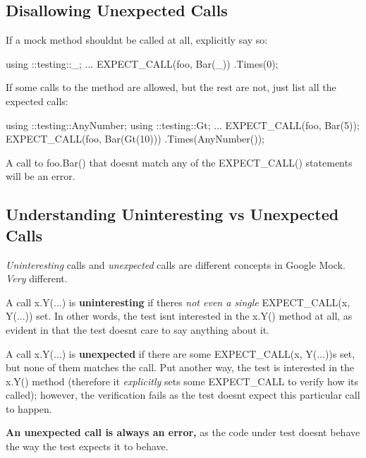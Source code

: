 \subsection*{Disallowing Unexpected Calls}

If a mock method shouldn\textquotesingle{}t be called at all, explicitly say so\+:


\begin{DoxyCode}
using ::testing::\_;
...
  EXPECT\_CALL(foo, Bar(\_))
      .Times(0);
\end{DoxyCode}


If some calls to the method are allowed, but the rest are not, just list all the expected calls\+:


\begin{DoxyCode}
using ::testing::AnyNumber;
using ::testing::Gt;
...
  EXPECT\_CALL(foo, Bar(5));
  EXPECT\_CALL(foo, Bar(Gt(10)))
      .Times(AnyNumber());
\end{DoxyCode}


A call to {\ttfamily foo.\+Bar()} that doesn\textquotesingle{}t match any of the {\ttfamily E\+X\+P\+E\+C\+T\+\_\+\+C\+A\+L\+L()} statements will be an error.

\subsection*{Understanding Uninteresting vs Unexpected Calls}

{\itshape Uninteresting} calls and {\itshape unexpected} calls are different concepts in Google Mock. {\itshape Very} different.

A call {\ttfamily x.\+Y(...)} is {\bfseries uninteresting} if there\textquotesingle{}s {\itshape not even a single} {\ttfamily E\+X\+P\+E\+C\+T\+\_\+\+C\+A\+LL(x, Y(...))} set. In other words, the test isn\textquotesingle{}t interested in the {\ttfamily x.\+Y()} method at all, as evident in that the test doesn\textquotesingle{}t care to say anything about it.

A call {\ttfamily x.\+Y(...)} is {\bfseries unexpected} if there are some {\ttfamily E\+X\+P\+E\+C\+T\+\_\+\+C\+A\+LL(x, Y(...))s} set, but none of them matches the call. Put another way, the test is interested in the {\ttfamily x.\+Y()} method (therefore it {\itshape explicitly} sets some {\ttfamily E\+X\+P\+E\+C\+T\+\_\+\+C\+A\+LL} to verify how it\textquotesingle{}s called); however, the verification fails as the test doesn\textquotesingle{}t expect this particular call to happen.

{\bfseries An unexpected call is always an error,} as the code under test doesn\textquotesingle{}t behave the way the test expects it to behave.

